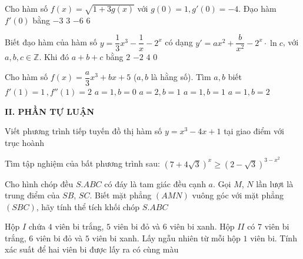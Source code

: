 \begin{ex}
Cho hàm số $f(x)=\sqrt{1+3g(x)}$ với $g(0)=1,g'(0)=-4$. Đạo hàm $f'(0)$ bằng
\choice
{$-3$}
{$3$}
{$-6$}
{$6$}
\end{ex}
\begin{ex}
Biết đạo hàm của hàm số $y=\dfrac{1}{3}x^3-\dfrac{1}{x}-2^x$ có dạng $y'=ax^2+\dfrac{b}{x^2}-2^x \cdot \ln c$, với $a,b,c\in \mathbb{Z}$. Khi đó $a+b+c$ bằng
\choice
{$2$}
{$-2$}
{$4$}
{$0$}
\end{ex}
\begin{ex}
Cho hàm số $f(x)=\dfrac{a}{3}x^3+bx+5$ ($a,b$ là hằng số). Tìm $a,b$ biết $f'(1)=1\,,f''(1)=2$
\choice
{$a=1,b=0$}
{$a=2,b=1$}
{$a=1,b=1$}
{$a=1,b=2$}
\end{ex}

\noindent\textbf{II. PHẦN TỰ LUẬN}

\begin{ex}
Viết phương trình tiếp tuyến đồ thị hàm số $y=x^3-4x+1$ tại giao điểm với trục hoành
\end{ex}
\begin{ex}
Tìm tập nghiệm của bất phương trình sau: $\left(7+4\sqrt{3}\right)^x\ge \left(2-\sqrt{3}\right)^{3-x^2}$
\end{ex}
\begin{ex}
Cho hình chóp đều $S.ABC$ có đáy là tam giác đều cạnh $a$. Gọi $M$, $N$ lần lượt là trung điểm của $SB$, $SC$. Biết mặt phẳng $(AMN)$ vuông góc với mặt phẳng $(SBC)$, hãy tính thể tích khối chóp $S.ABC$
\end{ex}
\begin{ex}
Hộp $I$ chứa $4$ viên bi trắng, $5$ viên bi đỏ và $6$ viên bi xanh. Hộp $II$ có $7$ viên bi trắng, $6$ viên bi đỏ và $5$ viên bi xanh. Lấy ngẫu nhiên từ mỗi hộp $1$ viên bi. Tính xác suất để hai viên bi được lấy ra có cùng màu
\end{ex}

